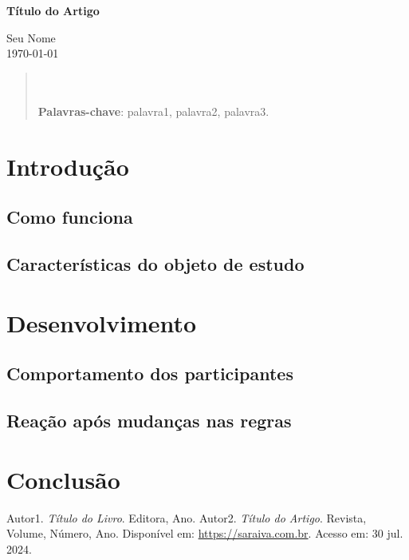 \documentclass[a4paper,12pt]{article}
\begin{document}
\begin{center}
    \textbf{\huge Título do Artigo} \\[3cm]
\end{center}

\begin{flushright}
    Seu Nome \\[0.5cm]
    \today
\end{flushright}

\begin{abstract}
\noindent
\lipsum[1] \\ \\
\textbf{Palavras-chave}: palavra1, palavra2, palavra3.
\end{abstract}

\newpage

\renewcommand{\contentsname}{\centerline{\textbf{SUMÁRIO}}}
\tableofcontents
\newpage

\section{Introdução}
\lipsum[3-4] %

\subsection{Como funciona}
\lipsum[5-6] 
\cite{ref1}  %

\subsection{Características do objeto de estudo}
\lipsum[7-8]
\cite{ref1}

\section{Desenvolvimento}
\lipsum[9-10]

\subsection{Comportamento dos participantes}
\lipsum[11-12]

\subsection{Reação após mudanças nas regras}
\lipsum[13-14]

\newpage

\section{Conclusão}
\lipsum[15-16]

\newpage

\begin{thebibliography}{9} %
     Autor1. \textit{Título do Livro}. Editora, Ano.
     Autor2. \textit{Título do Artigo}. Revista, Volume, Número, Ano. Disponível em: \url{https://saraiva.com.br}. Acesso em: 30 jul. 2024.
\end{thebibliography}
\end{document}
